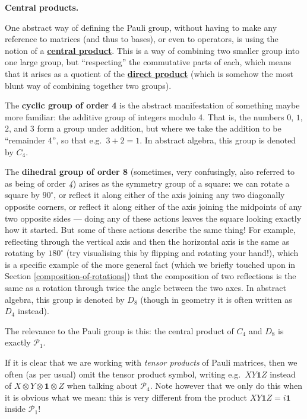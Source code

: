 \documentclass[fleqn,a4paper]{article}
\newenvironment{technical}[1]{\textbf{#1.}\par\vspace{.5\baselineskip}\everypar{\setlength{\parindent}{1.5em}}}{}
\theoremstyle{definition}
\theoremstyle{definition}
\theoremstyle{definition}
\theoremstyle{definition}
\theoremstyle{remark}
\begin{document}
\begin{technical}{Central products}
One abstract way of defining the Pauli group, without having to make any reference to matrices (and thus to bases), or even to operators, is using the notion of a \href{https://en.wikipedia.org/wiki/Central_product}{\textbf{central product}}.
This is a way of combining two smaller group into one large group, but ``respecting'' the commutative parts of each, which means that it arises as a quotient of the \href{https://en.wikipedia.org/wiki/Direct_product_of_groups}{\textbf{direct product}} (which is somehow the most blunt way of combining together two groups).

The \textbf{cyclic group of order 4} is the abstract manifestation of something maybe more familiar: the additive group of integers modulo 4.
That is, the numbers \(0\), \(1\), \(2\), and \(3\) form a group under addition, but where we take the addition to be ``remainder 4'', so that e.g.~\(3+2=1\).
In abstract algebra, this group is denoted by \(C_4\).

The \textbf{dihedral group of order 8} (sometimes, very confusingly, also referred to as being of order \emph{4}) arises as the symmetry group of a square: we can rotate a square by \(90^\circ\), or reflect it along either of the axis joining any two diagonally opposite corners, or reflect it along either of the axis joining the midpoints of any two opposite sides --- doing any of these actions leaves the square looking exactly how it started.
But some of these actions describe the same thing!
For example, reflecting through the vertical axis and then the horizontal axis is the same as rotating by \(180^\circ\) (try visualising this by flipping and rotating your hand!), which is a specific example of the more general fact (which we briefly touched upon in Section \ref{composition-of-rotations}) that the composition of two reflections is the same as a rotation through twice the angle between the two axes.
In abstract algebra, this group is denoted by \(D_8\) (though in geometry it is often written as \(D_4\) instead).

The relevance to the Pauli group is this: the central product of \(C_4\) and \(D_8\) is exactly \(\mathcal{P}_1\).

\end{technical}

If it is clear that we are working with \emph{tensor products} of Pauli matrices, then we often (as per usual) omit the tensor product symbol, writing e.g.~\(XY\mathbf{1}Z\) instead of \(X\otimes Y\otimes\mathbf{1}\otimes Z\) when talking about \(\mathcal{P}_4\).
Note however that we only do this when it is obvious what we mean: this is very different from the product \(XY\mathbf{1}Z=i\mathbf{1}\) inside \(\mathcal{P}_1\)!
\end{document}
